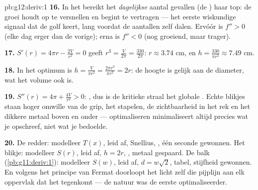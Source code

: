 \begin{solution}{pb:g12:deriv:1}
\textbf{16.} In het  bereikt het \emph{dagelijkse} aantal gevallen
(de ) haar top: de groei houdt op te versnellen en begint te
vertragen --- het eerste wiskundige signaal dat de golf keert, lang voordat de
aantallen zelf dalen. Ervóór is $f'' > 0$ (elke dag erger dan de vorige);
erna is $f'' < 0$ (nog groeiend, maar trager).

\textbf{17.} $S'(r) = 4\pi r - \frac{2V}{r^2} = 0$ geeft
$r^3 = \frac{V}{2\pi} = \frac{330}{2\pi}$: $r \approx 3.74$ cm, en
$h = \frac{330}{\pi r^2} \approx 7.49$ cm.

\textbf{18.} In het optimum is $h = \frac{V}{\pi r^2} =
\frac{2\pi r^3}{\pi r^2} = 2r$: de hoogte is gelijk aan de diameter, wat het
volume ook is.

\textbf{19.} $S''(r) = 4\pi + \frac{4V}{r^3} > 0$: , dus is de kritieke
straal het globale . Echte blikjes staan hoger omwille van de grip,
het stapelen, de zichtbaarheid in het rek en het dikkere metaal boven en
onder --- optimaliseren minimaliseert altijd precies wat je opschreef, niet
wat je bedoelde.

\textbf{20.} De redder: modelleer $T(x)$, leid af, Snellius, , één
seconde gewonnen. Het blikje: modelleer $S(r)$, leid af, $h = 2r$,
, metaal gespaard. De balk (\cref{pb:g11:deriv:1}): modelleer
$S(w)$, leid af, $d = w\sqrt2$, tabel, stijfheid gewonnen. En volgens het
principe van Fermat doorloopt het licht zelf die pijplijn aan elk oppervlak
dat het tegenkomt --- de natuur was de eerste optimaliseerder.
\end{solution}

